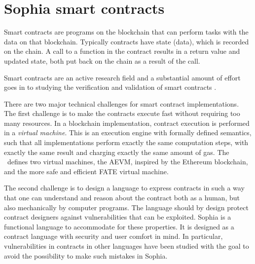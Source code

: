 \section{Sophia smart contracts}
\label{sect:sophia}

Smart contracts \cite{szabo1996smart,hhz007} are
programs on the blockchain that can perform tasks with the data on that
blockchain. Typically contracts have state (data), which is recorded on the
chain. A call to a function in the contract results in a return value
and updated state, both put back on the chain as a result of the
call.

Smart contracts are an active research field
\cite{DBLP:journals/corr/abs-1710-06372} and a substantial amount of
  effort goes in to studying the verification and validation of smart contracts
  \cite{magazzeni2017validation,bhargavan2016formal}.

There are two major technical challenges for smart contract
implementations. The first challenge is to make the contracts
execute fast without requiring too many resources. In a blockchain
implementation, contract execution is performed in a
\textit{virtual machine}. This is an execution engine with formally
defined semantics, such that all implementations perform exactly the
same computation steps, with exactly the same result and charging
exactly the same amount of gas. The \blockchain\ defines two virtual
machines, the AEVM, inspired by the Ethereum blockchain, and the more
safe and efficient FATE virtual machine.

The second challenge is to design a language to express contracts in
such a way that one can understand and reason about the contract
both as a human, but also mechanically by computer programs. The
language should by design protect contract designers against
vulnerabilities that can be exploited. Sophia is a functional language
to accommodate for these properties. It is designed as a contract
language with security and user comfort in mind. In particular,
vulnerabilities in contracts in other languages
\cite{atzei2017survey,mehar2019understanding,delmolino2016step} have been
studied with the goal to
avoid the possibility to make such mistakes in Sophia.


